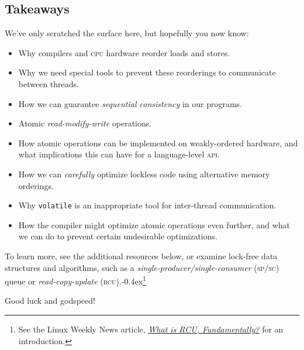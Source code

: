 \documentclass[fontsize=10pt, numbers=endperiod]{scrartcl}
\newcommand{\punckern}{\kern-0.4ex}
\newcommand{\monobox}[1]{\mbox{\texttt{#1}}}
\newcommand{\keyword}[1]{\monobox{\color{darkGreen}#1}}
\newcommand{\introduce}[1]{\textit{#1}}
\begin{document}
\begin{multicols*}{2}
\section{Takeaways}

We've only scratched the surface here,
but hopefully you now know:
\begin{itemize}
\item Why compilers and \textsc{cpu} hardware reorder loads and stores.
\item Why we need special tools to prevent these reorderings
    to communicate between threads.
\item How we can guarantee \introduce{sequential consistency} in our programs.
\item Atomic \introduce{read-modify-write} operations.
\item How atomic operations can be implemented on weakly-ordered hardware,
    and what implications this can have for a language-level \textsc{api}.
\item How we can \emph{carefully} optimize lockless code using alternative
    memory orderings.
\item Why \keyword{volatile} is an inappropriate tool for inter-thread
    communication.
\item How the compiler might optimize atomic operations even further,
    and what we can do to prevent certain undesirable optimizations.
\end{itemize}
To learn more, see the additional resources below,
or examine lock-free data structures and algorithms,
such as a \introduce{single-producer/single-consumer}
\textsc{(sp/sc)} queue or \introduce{read-copy-update}
\textsc{(rcu)}.\punckern\footnote{See the Linux Weekly News article,
\href{https://lwn.net/Articles/262464/}{\textit{What is RCU, Fundamentally?}}
for an introduction.}

\vspace{\baselineskip}
\noindent Good luck and godspeed!

\end{multicols*}

\appendix
\setcounter{secnumdepth}{0}
\end{document}
